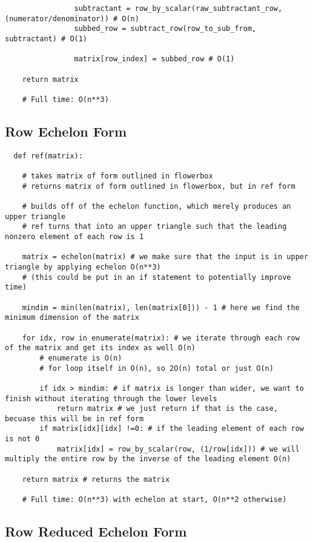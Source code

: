 \documentclass[12pt, a4paper]{article}
\begin{document}
\begin{lstlisting}
                subtractant = row_by_scalar(raw_subtractant_row, (numerator/denominator)) # O(n)
                subbed_row = subtract_row(row_to_sub_from, subtractant) # O(1)

                matrix[row_index] = subbed_row # O(1)
    
    return matrix
    
    # Full time: O(n**3)
\end{lstlisting}

\subsection{Row Echelon Form}

\begin{lstlisting}
  def ref(matrix):

    # takes matrix of form outlined in flowerbox
    # returns matrix of form outlined in flowerbox, but in ref form

    # builds off of the echelon function, which merely produces an upper triangle
    # ref turns that into an upper triangle such that the leading nonzero element of each row is 1
    
    matrix = echelon(matrix) # we make sure that the input is in upper triangle by applying echelon O(n**3)
    # (this could be put in an if statement to potentially improve time)

    mindim = min(len(matrix), len(matrix[0])) - 1 # here we find the minimum dimension of the matrix

    for idx, row in enumerate(matrix): # we iterate through each row of the matrix and get its index as well O(n)
        # enumerate is O(n) 
        # for loop itself in O(n), so 2O(n) total or just O(n)

        if idx > mindim: # if matrix is longer than wider, we want to finish without iterating through the lower levels
            return matrix # we just return if that is the case, becuase this will be in ref form
        if matrix[idx][idx] !=0: # if the leading element of each row is not 0
            matrix[idx] = row_by_scalar(row, (1/row[idx])) # we will multiply the entire row by the inverse of the leading element O(n)

    return matrix # returns the matrix

    # Full time: O(n**3) with echelon at start, O(n**2 otherwise)
\end{lstlisting}

\subsection{Row Reduced Echelon Form}
\end{document}
